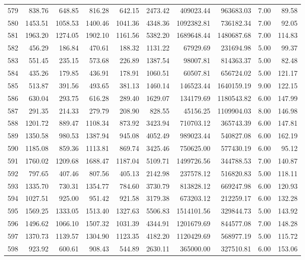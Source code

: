 \begin{tabular}{lrrrrrrrrr}
579 & 838.76 & 648.85 & 816.28 & 642.15 & 2473.42 & 409023.44 & 963683.03 & 7.00 & 89.58 \\
580 & 1453.51 & 1058.53 & 1400.46 & 1041.36 & 4348.36 & 1092382.81 & 736182.34 & 7.00 & 92.05 \\
581 & 1963.20 & 1274.05 & 1902.10 & 1161.56 & 5382.20 & 1689648.44 & 1480687.68 & 7.00 & 114.83 \\
582 & 456.29 & 186.84 & 470.61 & 188.32 & 1131.22 & 67929.69 & 231694.98 & 5.00 & 99.37 \\
583 & 551.45 & 235.15 & 573.68 & 226.89 & 1387.54 & 98007.81 & 814363.37 & 5.00 & 82.48 \\
584 & 435.26 & 179.85 & 436.91 & 178.91 & 1060.51 & 60507.81 & 656724.02 & 5.00 & 121.17 \\
585 & 513.87 & 391.56 & 493.65 & 381.13 & 1460.14 & 146523.44 & 1640159.19 & 9.00 & 122.15 \\
586 & 630.04 & 293.75 & 616.28 & 289.40 & 1629.07 & 134179.69 & 1180543.82 & 6.00 & 147.99 \\
587 & 291.35 & 214.33 & 279.79 & 208.90 & 828.55 & 45156.25 & 1109904.03 & 8.00 & 146.98 \\
588 & 1201.72 & 889.47 & 1108.34 & 873.92 & 3423.94 & 710703.12 & 365743.39 & 6.00 & 147.81 \\
589 & 1350.58 & 980.53 & 1387.94 & 945.08 & 4052.49 & 989023.44 & 540827.08 & 6.00 & 162.19 \\
590 & 1185.08 & 859.36 & 1113.81 & 869.74 & 3425.46 & 750625.00 & 577430.19 & 6.00 & 95.12 \\
591 & 1760.02 & 1209.68 & 1688.47 & 1187.04 & 5109.71 & 1499726.56 & 344788.53 & 7.00 & 140.87 \\
592 & 797.65 & 407.46 & 807.56 & 405.13 & 2142.98 & 237578.12 & 516820.83 & 5.00 & 118.11 \\
593 & 1335.70 & 730.31 & 1354.77 & 784.60 & 3730.79 & 813828.12 & 669247.98 & 6.00 & 120.93 \\
594 & 1027.51 & 925.00 & 951.42 & 921.58 & 3179.38 & 673203.12 & 212259.17 & 6.00 & 132.28 \\
595 & 1569.25 & 1333.05 & 1513.40 & 1327.63 & 5506.83 & 1514101.56 & 329844.73 & 5.00 & 143.92 \\
596 & 1496.62 & 1066.10 & 1507.32 & 1031.39 & 4344.91 & 1201679.69 & 844577.08 & 7.00 & 148.28 \\
597 & 1370.73 & 1139.57 & 1304.90 & 1123.35 & 4182.20 & 1120429.69 & 568977.19 & 5.00 & 115.72 \\
598 & 923.92 & 600.61 & 908.43 & 544.89 & 2630.11 & 365000.00 & 327510.81 & 6.00 & 153.06 \\

\end{tabular}
